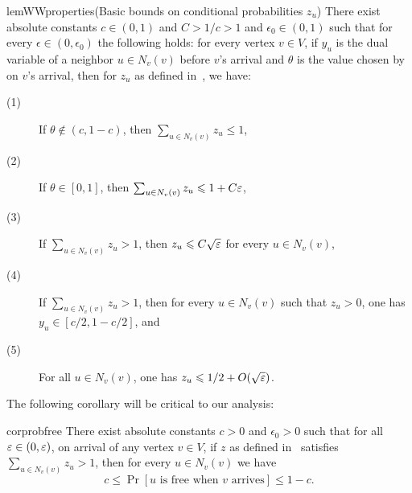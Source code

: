 \begin{restatable}{lem}{WWproperties}(Basic bounds on conditional probabilities $z_u$)\label{lem:propertiesWW}
There exist absolute constants $c\in (0, 1)$  and $C>1/c>1$ and $\epsilon_0\in (0, 1)$ such that for every $\epsilon\in (0, \epsilon_0)$ the following holds: for every vertex $v\in V$, if $y_u$ is the dual variable of a neighbor $u\in N_v(v)$ before $v$'s arrival and $\theta$ is the value chosen by  on $v$'s arrival, then for $z_u$ as defined in~, we have:
	
	\begin{description}
		\item[(1)] If $\theta\not\in (c, 1-c)$, then $\sum_{u\in N_v(v)} z_u\leq 1$,
		\item[(2)] If $\theta\in [0, 1]$, then $\sum_{u\in N_v(v)} z_u           \leqslant 1+C\varepsilon$,
		\item[(3)] If $\sum_{u\in N_v(v)} z_u>1$, then 
		$z_u\leqslant C\sqrt{\varepsilon}$ for every $u\in N_v(v)$,
		\item[(4)] If $\sum_{u\in N_v(v)} z_u>1$, then for every $u\in N_v(v)$ such that $z_u>0$, one has $y_u\in [c/2, 1-c/2]$, and
		\item[(5)] For all $u \in N_v(v)$, one has $z_u \leqslant 1/2 + O(\sqrt{\varepsilon})$.
	\end{description}
\end{restatable}

The following corollary will be critical to our analysis:
\begin{restatable}{cor}{probfree}\label{cor:ww}
There exist absolute constants $c>0$ and $\epsilon_0>0$ such that for all $\varepsilon\in (0,\varepsilon)$, on arrival of any vertex $v\in V$, if $z$ as defined in~ satisfies $\sum_{u\in N_v(v)} z_u > 1$, then for every $u\in N_v(v)$ we have 
$$
c\leq \Pr[\mbox{$u$ is free when $v$ arrives}] \leq 1-c.
$$
\end{restatable}

